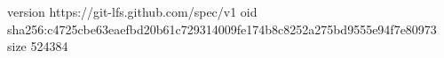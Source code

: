 version https://git-lfs.github.com/spec/v1
oid sha256:c4725cbe63eaefbd20b61c729314009fe174b8c8252a275bd9555e94f7e80973
size 524384
